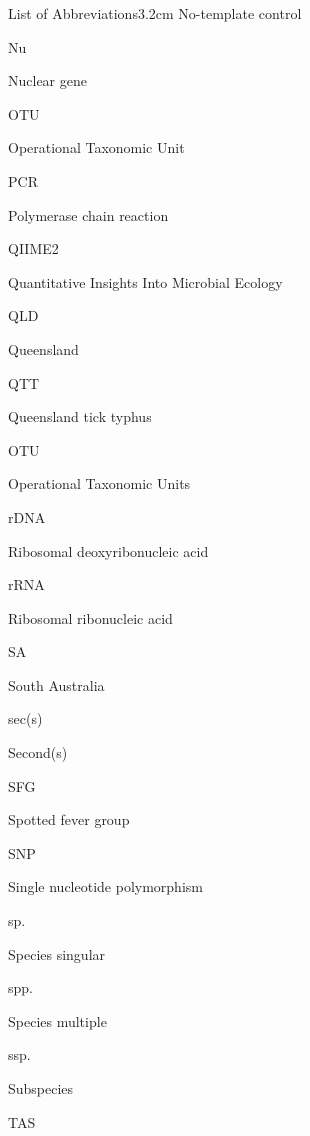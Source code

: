 \documentclass[a4paper, nobind]{templates/ociamthesis}
\begin{document}
\begin{romanpages}
\begin{mclistof}{List of Abbreviations}{3.2cm}
No-template control

\item[Nu]

Nuclear gene

\item[OTU]

Operational Taxonomic Unit

\item[PCR]

Polymerase chain reaction

\item[QIIME2]

Quantitative Insights Into Microbial Ecology

\item[QLD]

Queensland

\item[QTT]

Queensland tick typhus

\item[OTU]

Operational Taxonomic Units

\item[rDNA]

Ribosomal deoxyribonucleic acid

\item[rRNA]

Ribosomal ribonucleic acid

\item[SA]

South Australia

\item[sec(s)]

Second(s)

\item[SFG]

Spotted fever group

\item[SNP]

Single nucleotide polymorphism

\item[sp.]

Species singular

\item[spp.]

Species multiple

\item[ssp.]

Subspecies

\item[TAS]


\end{mclistof}
\end{romanpages}
\end{document}
